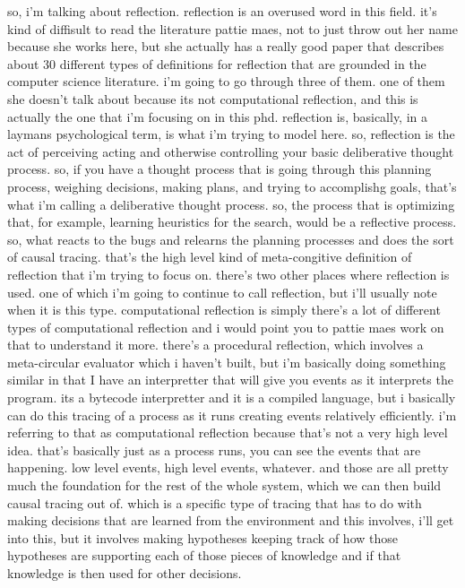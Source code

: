 so, i'm talking about reflection.
reflection is an overused word in this field.
it's kind of diffisult to read the literature
pattie maes, not to just throw out her name because she works here, but she actually has a really good paper that describes about 30 different types of definitions for reflection that are grounded in the computer science literature.
i'm going to go through three of them.
one of them she doesn't talk about because its not computational reflection, and this is actually the one that i'm focusing on in this phd.
reflection is, basically, in a laymans psychological term, is what i'm trying to model here.
so, reflection is the act of perceiving acting and otherwise controlling your basic deliberative thought process.
so, if you have a thought process that is going through this planning process, weighing decisions, making plans, and trying to accomplishg goals, that's what i'm calling a deliberative thought process.
so, the process that is optimizing that, for example, learning heuristics for the search, would be a reflective process.
so, what reacts to the bugs and relearns the planning processes and does the sort of causal tracing.
that's the high level kind of meta-congitive definition of reflection that i'm trying to focus on.
there's two other places where reflection is used.
one of which i'm going to continue to call reflection, but i'll usually note when it is this type.
computational reflection is simply there's a lot of different types of computational reflection and i would point you to pattie maes work on that to understand it more.
there's a procedural reflection, which involves a meta-circular evaluator which i haven't built, but i'm basically doing something similar in that I have an interpretter that will give you events as it interprets the program.
its a bytecode interpretter and it is a compiled language, but i basically can do this tracing of a process as it runs creating events relatively efficiently.
i'm referring to that as computational reflection because that's not a very high level idea.
that's basically just as a process runs, you can see the events that are happening.  low level events, high level events, whatever.
and those are all pretty much the foundation for the rest of the whole system, which we can then build causal tracing out of.
which is a specific type of tracing that has to do with making decisions that are learned from the environment
and this involves, i'll get into this, but it involves making hypotheses keeping track of how those hypotheses are supporting each of those pieces of knowledge and if that knowledge is then used for other decisions.
